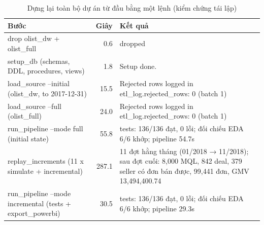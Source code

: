 \begin{table}[htbp]
\centering\small
\caption{Dựng lại toàn bộ dự án từ đầu bằng một lệnh (kiểm chứng tái lập)}
\label{tab:rebuild}
\begin{tabular}{p{6cm}rp{6cm}}
\toprule
\textbf{Bước} & \textbf{Giây} & \textbf{Kết quả} \\
\midrule
drop olist\_dw + olist\_full & 0.6 & dropped \\
setup\_db (schemas, DDL, procedures, views) & 1.8 & Setup done. \\
load\_source --initial (olist\_dw, to 2017-12-31) & 15.5 & Rejected rows logged in etl\_log.rejected\_rows: 0 (batch 1) \\
load\_source --full (olist\_full) & 24.0 & Rejected rows logged in etl\_log.rejected\_rows: 0 (batch 1) \\
run\_pipeline --mode full (initial state) & 55.8 & tests: 136/136 đạt, 0 lỗi; đối chiếu EDA 6/6 khớp; pipeline 54.7s \\
replay\_increments (11 x simulate + incremental) & 287.1 & 11 đợt hằng tháng (01/2018 → 11/2018); sau đợt cuối: 8,000 MQL, 842 deal, 379 seller có đơn bán được, 99,441 đơn, GMV 13,494,400.74 \\
run\_pipeline --mode incremental (tests + export\_powerbi) & 30.5 & tests: 136/136 đạt, 0 lỗi; đối chiếu EDA 6/6 khớp; pipeline 29.3s \\
\bottomrule
\end{tabular}
\end{table}
